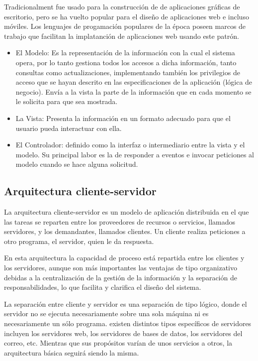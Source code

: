 Tradicionalment fue usado para la construcción de de aplicaciones gráficas de escritorio, pero se ha vuelto popular para el diseño de aplicaciones web e incluso móviles. Los lenguajes de progamación populares de la época poseen marcos de trabajo que facilitan la implatanción de aplicaciones web usando este patrón.

\begin{itemize}

\item El Modelo: Es la representación de la información con la cual el sistema opera, por lo tanto gestiona todos los accesos a dicha información, tanto consultas como actualizaciones, implementando también los privilegios de acceso que se hayan descrito en las especificaciones de la aplicación (lógica de negocio). Envía a la vista la parte de la información que en cada momento se le solicita para que sea mostrada.

\item La Vista: Presenta la información en un formato adecuado para que el usuario pueda interactuar con ella.

\item El Controlador: definido como la interfaz o intermediario entre la vista y el modelo. Su principal labor es la de responder a eventos e invocar peticiones al modelo cuando se hace alguna solicitud. 

\end{itemize}

\subsection{Arquitectura cliente-servidor}

La arquitectura cliente-servidor es un modelo de aplicación distribuida en el que las tareas se reparten entre los proveedores de recursos o servicios, llamados servidores, y los demandantes, llamados clientes. Un cliente realiza peticiones a otro programa, el servidor, quien le da respuesta.

En esta arquitectura la capacidad de proceso está repartida entre los clientes y los servidores, aunque son más importantes las ventajas de tipo organizativo debidas a la centralización de la gestión de la información y la separación de responsabilidades, lo que facilita y clarifica el diseño del sistema.

La separación entre cliente y servidor es una separación de tipo lógico, donde el servidor no se ejecuta necesariamente sobre una sola máquina ni es necesariamente un sólo programa. existen distintos tipos específicos de servidores incluyen los servidores web, los servidores de bases de datos, los servidores del correo, etc. Mientras que sus propósitos varían de unos servicios a otros, la arquitectura básica seguirá siendo la misma.

